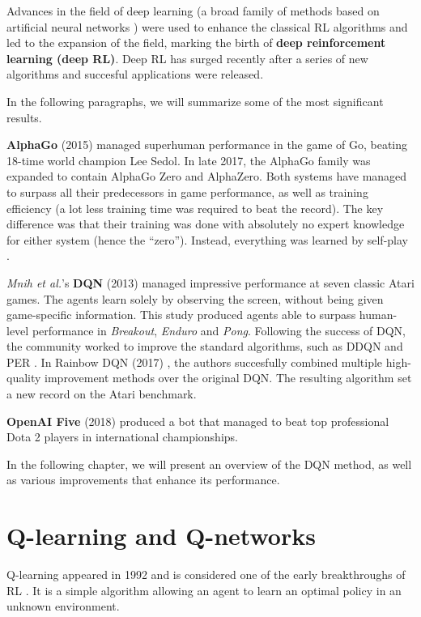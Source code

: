 Advances in the field of deep learning (a broad family of methods based on artificial neural networks \cite{wiki:Deep_learning}) were used to enhance the classical RL algorithms and led to the expansion of the field, marking the birth of \textbf{deep reinforcement learning (deep RL)}.
Deep RL has surged recently after a series of new algorithms and succesful applications were released.

In the following paragraphs, we will summarize some of the most significant results.

\textbf{AlphaGo} (2015) \cite{ago} managed superhuman performance in the game of Go, beating 18-time world champion Lee Sedol.
In late 2017, the AlphaGo family was expanded to contain AlphaGo Zero and AlphaZero\cite{alpha-zero}.
Both systems have managed to surpass all their predecessors in game performance, as well as training efficiency \cite{wiki:AlphaGo} (a lot less training time was required to beat the record).
The key difference was that their training was done with absolutely no expert knowledge for either system (hence the ``zero'').
Instead, everything was learned by self-play \cite{alpha-zero}.

\textit{Mnih et al.}'s \textbf{DQN} \cite{atari-dqn} (2013) managed impressive performance at seven classic Atari games.
The agents learn solely by observing the screen, without being given game-specific information.
This study produced agents able to surpass human-level performance in \emph{Breakout}, \emph{Enduro} and \emph{Pong}.
Following the success of DQN, the community worked to improve the standard algorithms, such as DDQN \cite{ddqn-paper} and PER \cite{per-paper}.
In Rainbow DQN (2017) \cite{rainbow-dqn}, the authors succesfully combined multiple high-quality improvement methods over the original DQN.
The resulting algorithm set a new record on the Atari benchmark.

\textbf{OpenAI Five} \cite{openai-dota} (2018) produced a bot that managed to beat top professional Dota 2 players in international championships.

In the following chapter, we will present an overview of the DQN method, as well as various improvements that enhance its performance.

\section{Q-learning and Q-networks}

Q-learning \cite{Watkins1992} appeared in 1992 and is considered one of the early breakthroughs of RL \cite{rlai}.
It is a simple algorithm allowing an agent to learn an optimal policy in an unknown environment.

